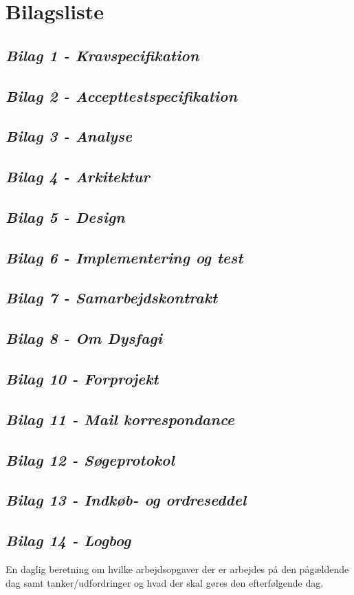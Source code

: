 \chapter{Bilagsliste}
\section*{\textit{Bilag 1 - Kravspecifikation}} \label{bilag1}
\section*{\textit{Bilag 2 - Accepttestspecifikation}} \label{bilag2}
\section*{\textit{Bilag 3 - Analyse}} \label{bilag3}
\section*{\textit{Bilag 4 - Arkitektur}} \label{bilag4}
\section*{\textit{Bilag 5 - Design}} \label{bilag5}
\section*{\textit{Bilag 6 - Implementering og test}} \label{bilag6}
\section*{\textit{Bilag 7 - Samarbejdskontrakt}} \label{bilag7}
\section*{\textit{Bilag 8 - Om Dysfagi}} \label{bilag8}
\section*{\textit{Bilag 10 - Forprojekt}} \label{bilag10}
\section*{\textit{Bilag 11 - Mail korrespondance}} \label{bilag11}
\section*{\textit{Bilag 12 - Søgeprotokol}} \label{bilag12}
\section*{\textit{Bilag 13 - Indkøb- og ordreseddel}} \label{bilag13}
\section*{\textit{Bilag 14 - Logbog}} \label{bilag14}
En daglig beretning om hvilke arbejdsopgaver der er arbejdes på den pågældende dag samt tanker/udfordringer og hvad der skal gøres den efterfølgende dag.



